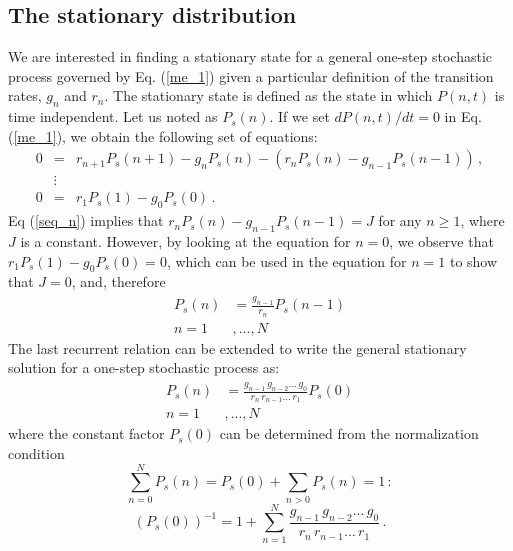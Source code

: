 \documentclass{article}
\begin{document}
\subsection{The stationary distribution}
\label{stationary_distribution}
We are interested in finding a stationary state for a general one-step stochastic process governed by Eq. (\ref{me_1}) given a particular definition of the transition rates, $g_n$ and $r_n$. The stationary state is defined as the state in which $P(n, t)$ is time independent. Let us noted as $P_s(n)$. If we set $dP(n,t)/dt=0$ in Eq. (\ref{me_1}), we obtain the following set of equations:
\begin{eqnarray}
\label{seq_n}
0 & = & r_{n+1} P_s(n+1) - g_n P_s(n) - (r_n P_s(n) - g_{n-1} P_s(n-1))\,, \\
&\vdots& \nonumber\\
\label{seq_0}
0 & = & r_{1} P_s(1) - g_0 P_s(0)\,.
\end{eqnarray}
Eq (\ref{seq_n}) implies that $r_n P_s(n) - g_{n-1} P_s(n-1) = J$ for any $n \ge 1$, where $J$ is a constant. However, by looking at the equation for $n=0$, we observe that $r_{1} P_s(1) - g_0 P_s(0) = 0$, which can be used in the equation for $n=1$ to show that $J = 0$, and, therefore 
\begin{align}
P_s(n) &= \frac{g_{n-1}}{r_n} P_s(n-1)\nonumber\\
   n =1&,...,N     
\label{balance}
\end{align}
The last recurrent relation can be extended to write the general stationary solution for a one-step stochastic process as: 
\begin{align}
P_s(n)      &= \frac{g_{n-1}\, g_{n-2} ...\, g_0}{r_n\, r_{n-1} ...\, r_1} P_s(0)\nonumber\\
        n =1&,...,N    
\label{P_stationary}
\end{align}
where the constant factor $P_s(0)$ can be determined from the normalization condition
\begin{equation}
\sum_{n=0}^N P_s(n) = P_s(0) + \sum_{n>0} P_s(n) = 1\, :
\label{Norma}
\end{equation}
\begin{equation}
(P_s(0))^{-1} = 1 + \sum_{n=1}^{N} \frac{g_{n-1}\, g_{n-2} ...\, g_0}{r_n\, 
	r_{n-1} ...\, r_1}\, .  
\label{inversionPs(0)}
\end{equation}
\end{document}
